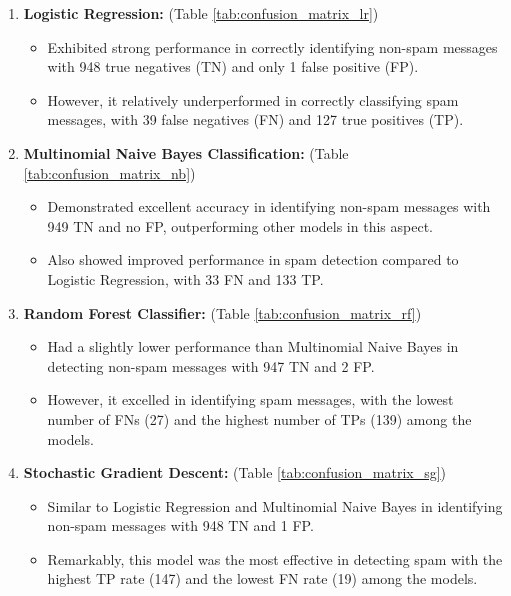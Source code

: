 \documentclass[12pt]{article}
\begin{document}
\begin{enumerate}
\setlength\itemsep{1em}
    \item \textbf{Logistic Regression:} (Table \ref{tab:confusion_matrix_lr})
    \begin{itemize}
    \setlength\itemsep{1em}
        \item Exhibited strong performance in correctly identifying non-spam messages with 948 true negatives (TN) and only 1 false positive (FP).
        \item However, it relatively underperformed in correctly classifying spam messages, with 39 false negatives (FN) and 127 true positives (TP).
    \end{itemize}

    \item \textbf{Multinomial Naive Bayes Classification:} (Table \ref{tab:confusion_matrix_nb})
    \begin{itemize}
    \setlength\itemsep{1em}
        \item Demonstrated excellent accuracy in identifying non-spam messages with 949 TN and no FP, outperforming other models in this aspect.
        \item Also showed improved performance in spam detection compared to Logistic Regression, with 33 FN and 133 TP.
    \end{itemize}

    \item \textbf{Random Forest Classifier:} (Table \ref{tab:confusion_matrix_rf})
    \begin{itemize}
    \setlength\itemsep{1em}
        \item Had a slightly lower performance than Multinomial Naive Bayes in detecting non-spam messages with 947 TN and 2 FP.
        \item However, it excelled in identifying spam messages, with the lowest number of FNs (27) and the highest number of TPs (139) among the models.
    \end{itemize}

    \item \textbf{Stochastic Gradient Descent:} (Table \ref{tab:confusion_matrix_sg})
    \begin{itemize}
    \setlength\itemsep{1em}
        \item Similar to Logistic Regression and Multinomial Naive Bayes in identifying non-spam messages with 948 TN and 1 FP.
        \item Remarkably, this model was the most effective in detecting spam with the highest TP rate (147) and the lowest FN rate (19) among the models.
    \end{itemize}
\end{enumerate}
\end{document}
